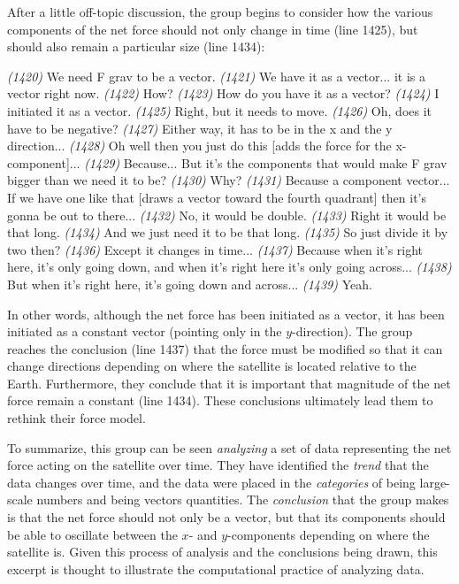 \documentclass{msuphddissertation}
\begin{document}
\begin{doublespace}
After a little off-topic discussion, the group begins to consider how the various components of the net force should not only change in time (line 1425), but should also remain a particular size (line 1434):  \begin{description}
\SB \textit{(1420)} We need F grav to be a vector.
\SD \textit{(1421)} We have it as a vector... it is a vector right now.
\SB \textit{(1422)} How?
\SA \textit{(1423)} How do you have it as a vector?
\SD \textit{(1424)} I initiated it as a vector.
\SB \textit{(1425)} Right, but it needs to move.
\SD \textit{(1426)} Oh, does it have to be negative?
\SB \textit{(1427)} Either way, it has to be in the x and the y direction...
\SD \textit{(1428)} Oh well then you just do this [adds the force for the x-component]...
\SB \textit{(1429)} Because... But it's the components that would make F grav bigger than we need it to be?
\SD \textit{(1430)} Why?
\SB \textit{(1431)} Because a component vector... If we have one like that [draws a vector toward the fourth quadrant] then it's gonna be out to there...
\SC \textit{(1432)} No, it would be double.
\SB \textit{(1433)} Right it would be that long.
\SB \textit{(1434)} And we just need it to be that long.
\SD \textit{(1435)} So just divide it by two then?
\SB \textit{(1436)} Except it changes {in time}...
\SB \textit{(1437)} Because when it's right here, it's only going down, and when it's right here it's only going across...
\SB \textit{(1438)} But when it's right here, it's going down and across...
\SC \textit{(1439)} Yeah.
\end{description}  In other words, although the net force has been initiated as a vector, it has been initiated as a constant vector (pointing only in the $y$-direction).  The group reaches the conclusion (line 1437) that the force must be modified so that it can change directions depending on where the satellite is located relative to the Earth.  Furthermore, they conclude that it is important that magnitude of the net force remain a constant (line 1434).  These conclusions ultimately lead them to rethink their force model.

To summarize, this group can be seen \textit{analyzing} a set of data representing the net force acting on the satellite over time.  They have identified the \textit{trend} that the data changes over time, and the data were placed in the \textit{categories} of being large-scale numbers and being vectors quantities.  The \textit{conclusion} that the group makes is that the net force should not only be a vector, but that its components should be able to oscillate between the $x$- and $y$-components depending on where the satellite is.  Given this process of analysis and the conclusions being drawn, this excerpt is thought to illustrate the computational practice of analyzing data.


\end{doublespace}
\end{document}
